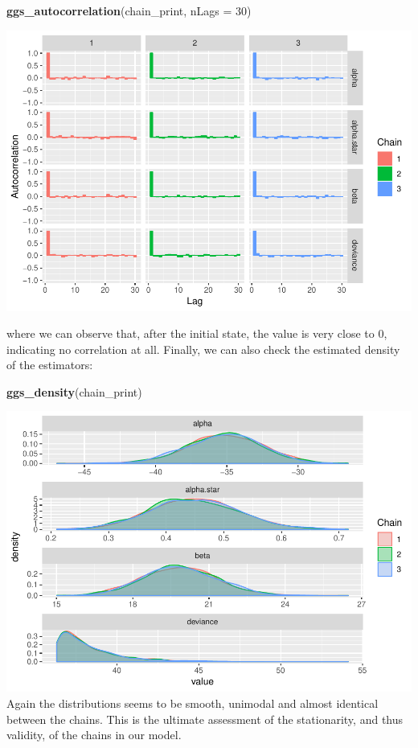 \documentclass[]{article}
\newenvironment{Shaded}{\begin{snugshade}}{\end{snugshade}}
\newcommand{\DataTypeTok}[1]{\textcolor[rgb]{0.13,0.29,0.53}{#1}}
\newcommand{\DecValTok}[1]{\textcolor[rgb]{0.00,0.00,0.81}{#1}}
\newcommand{\KeywordTok}[1]{\textcolor[rgb]{0.13,0.29,0.53}{\textbf{#1}}}
\newcommand{\NormalTok}[1]{#1}
\begin{document}
\begin{Shaded}
\begin{Highlighting}[]
\KeywordTok{ggs_autocorrelation}\NormalTok{(chain_print, }\DataTypeTok{nLags =} \DecValTok{30}\NormalTok{)}
\end{Highlighting}
\end{Shaded}

\includegraphics{FinalProject-SDSII_files/figure-latex/unnamed-chunk-19-1.pdf}

where we can observe that, after the initial state, the value is very
close to 0, indicating no correlation at all. Finally, we can also check
the estimated density of the estimators:

\begin{Shaded}
\begin{Highlighting}[]
\KeywordTok{ggs_density}\NormalTok{(chain_print)}
\end{Highlighting}
\end{Shaded}

\includegraphics{FinalProject-SDSII_files/figure-latex/unnamed-chunk-20-1.pdf}
Again the distributions seems to be smooth, unimodal and almost
identical between the chains. This is the ultimate assessment of the
stationarity, and thus validity, of the chains in our model.
\end{document}
